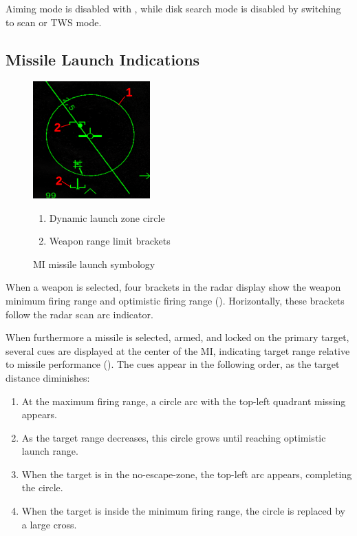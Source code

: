 Aiming mode is disabled with , while disk search mode is disabled by switching to scan or TWS mode.


\subsection{Missile Launch Indications}
\begin{figure}[!ht]
  \centering
  \includegraphics[width=0.4\textwidth]{images/displays/MI-launch.png}

  \begin{multicols}{2}
    \begin{enumerate}[nosep]
      \item \label{item:dlz-disk} Dynamic launch zone circle
      \item \label{item:wpn-range} Weapon range limit brackets
    \end{enumerate}
  \end{multicols}

  \caption{MI missile launch symbology}
  \label{fig:mi-launch}
\end{figure}

When a weapon is selected, four brackets in the radar display show the weapon minimum firing range
and optimistic firing range ().
Horizontally, these brackets follow the radar scan arc indicator.

When furthermore a missile is selected, armed, and locked on the primary target,
several cues are displayed at the center of the MI,
indicating target range relative to missile performance ().
The cues appear in the following order, as the target distance diminishes:
\begin{enumerate}[noitemsep]
  \item At the maximum firing range, a circle arc with the top-left quadrant missing appears.
  \item As the target range decreases, this circle grows until reaching optimistic launch range.
  \item When the target is in the no-escape-zone, the top-left arc appears, completing the circle.
  \item When the target is inside the minimum firing range, the circle is replaced by a large cross.
\end{enumerate}
